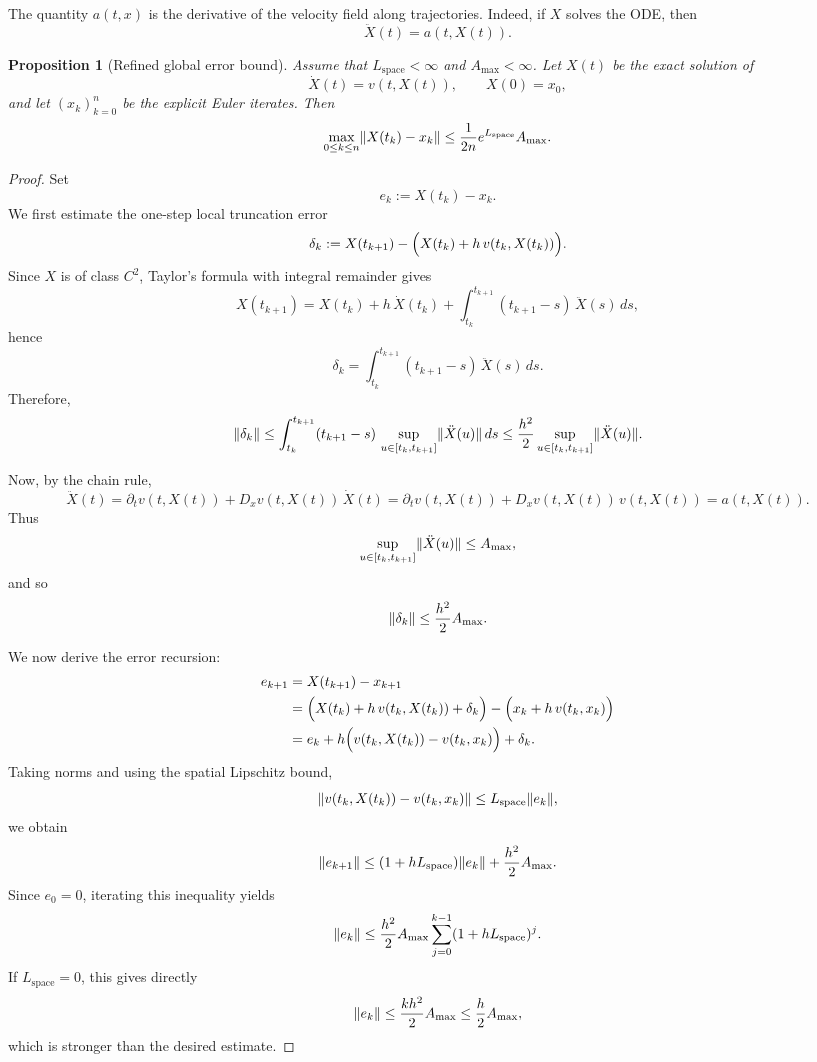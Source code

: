 \documentclass[11pt]{article}
\newtheorem{proposition}{Proposition}
\DeclarePairedDelimiter{\norm}{\lVert}{\rVert}
\begin{document}
The quantity $a(t,x)$ is the derivative of the velocity field along trajectories. Indeed, if $X$ solves the ODE, then
\[
\ddot X(t)=a(t,X(t)).
\]


\begin{proposition}[Refined global error bound]\label{prop:main}
Assume that $L_{\mathrm{space}}<\infty$ and $A_{\max}<\infty$. Let $X(t)$ be the exact solution of
\[
\dot X(t)=v(t,X(t)),
\qquad
X(0)=x_0,
\]
and let $(x_k)_{k=0}^n$ be the explicit Euler iterates. Then
\[
\max_{0\leq k\leq n}\norm{X(t_k)-x_k}
\leq
\frac{1}{2n}e^{L_{\mathrm{space}}}A_{\max}.
\]
\end{proposition}

\begin{proof}
Set
\[
e_k:=X(t_k)-x_k.
\]
We first estimate the one-step local truncation error
\[
\delta_k
:=
X(t_{k+1})-\Bigl(X(t_k)+h\,v(t_k,X(t_k))\Bigr).
\]
Since $X$ is of class $C^2$, Taylor's formula with integral remainder gives
\[
X(t_{k+1})
=
X(t_k)+h\,\dot X(t_k)+\int_{t_k}^{t_{k+1}} (t_{k+1}-s)\,\ddot X(s)\,ds,
\]
hence
\[
\delta_k=\int_{t_k}^{t_{k+1}} (t_{k+1}-s)\,\ddot X(s)\,ds.
\]
Therefore,
\[
\norm{\delta_k}
\leq
\int_{t_k}^{t_{k+1}} (t_{k+1}-s)\,
\sup_{u\in[t_k,t_{k+1}]}\norm{\ddot X(u)}\,ds
\leq
\frac{h^2}{2}\sup_{u\in[t_k,t_{k+1}]}\norm{\ddot X(u)}.
\]

Now, by the chain rule,
\[
\ddot X(t)
=
\partial_t v(t,X(t))+D_x v(t,X(t))\,\dot X(t)
=
\partial_t v(t,X(t))+D_x v(t,X(t))\,v(t,X(t))
=
a(t,X(t)).
\]
Thus
\[
\sup_{u\in[t_k,t_{k+1}]}\norm{\ddot X(u)}
\leq
A_{\max},
\]
and so
\[
\norm{\delta_k}\leq \frac{h^2}{2}A_{\max}.
\]

We now derive the error recursion:
\begin{align*}
e_{k+1}
&=
X(t_{k+1})-x_{k+1}\\
&=
\Bigl(X(t_k)+h\,v(t_k,X(t_k))+\delta_k\Bigr)
-\Bigl(x_k+h\,v(t_k,x_k)\Bigr)\\
&=
e_k+h\Bigl(v(t_k,X(t_k))-v(t_k,x_k)\Bigr)+\delta_k.
\end{align*}
Taking norms and using the spatial Lipschitz bound,
\[
\norm{v(t_k,X(t_k))-v(t_k,x_k)}
\leq
L_{\mathrm{space}}\norm{e_k},
\]
we obtain
\[
\norm{e_{k+1}}
\leq
(1+hL_{\mathrm{space}})\norm{e_k}+\frac{h^2}{2}A_{\max}.
\]
Since $e_0=0$, iterating this inequality yields
\[
\norm{e_k}
\leq
\frac{h^2}{2}A_{\max}\sum_{j=0}^{k-1}(1+hL_{\mathrm{space}})^j.
\]
If $L_{\mathrm{space}}=0$, this gives directly
\[
\norm{e_k}\leq \frac{kh^2}{2}A_{\max}\leq \frac{h}{2}A_{\max},
\]
which is stronger than the desired estimate.


\end{proof}
\end{document}
